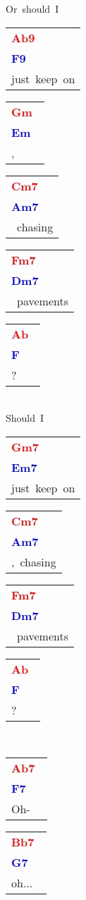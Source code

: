 \documentclass[12pt,a4paper,openany,UTF8]{memoir}
\begin{document}
Or~should~I~\begin{tabular}[b]{l}
    \textbf{\textcolor{red}{Ab9\ }}\\\textbf{\textcolor{blue}{F9\ }}\\
    just~keep~on\mbox{}\end{tabular}\begin{tabular}[b]{l}
    \textbf{\textcolor{red}{Gm\ }}\\\textbf{\textcolor{blue}{Em\ }}\\
    ,\mbox{}\end{tabular}\begin{tabular}[b]{l}
    \textbf{\textcolor{red}{Cm7\ }}\\\textbf{\textcolor{blue}{Am7\ }}\\
    ~chasing\mbox{}\end{tabular}\begin{tabular}[b]{l}
    \textbf{\textcolor{red}{Fm7\ }}\\\textbf{\textcolor{blue}{Dm7\ }}\\
    ~pavements\mbox{}\end{tabular}\begin{tabular}[b]{l}
    \textbf{\textcolor{red}{Ab\ }}\\\textbf{\textcolor{blue}{F\ }}\\
    ?\mbox{}\end{tabular}\\
Should~I~\begin{tabular}[b]{l}
    \textbf{\textcolor{red}{Gm7\ }}\\\textbf{\textcolor{blue}{Em7\ }}\\
    just~keep~on\mbox{}\end{tabular}\begin{tabular}[b]{l}
    \textbf{\textcolor{red}{Cm7\ }}\\\textbf{\textcolor{blue}{Am7\ }}\\
    ,~chasing\mbox{}\end{tabular}\begin{tabular}[b]{l}
    \textbf{\textcolor{red}{Fm7\ }}\\\textbf{\textcolor{blue}{Dm7\ }}\\
    ~pavements\mbox{}\end{tabular}\begin{tabular}[b]{l}
    \textbf{\textcolor{red}{Ab\ }}\\\textbf{\textcolor{blue}{F\ }}\\
    ?\mbox{}\end{tabular}\\
\begin{tabular}[b]{l}
    \textbf{\textcolor{red}{Ab7\ }}\\\textbf{\textcolor{blue}{F7\ }}\\
    Oh-\mbox{}\end{tabular}\begin{tabular}[b]{l}
    \textbf{\textcolor{red}{Bb7\ }}\\\textbf{\textcolor{blue}{G7\ }}\\
    oh...\mbox{}\end{tabular}
\end{document}
